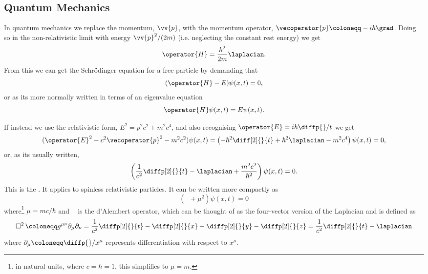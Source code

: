 \documentclass[fleqn]{NotesClass}
\newcommand*{\dAlembert}{\mathop{{}\Box^2}\nolimits}
\begin{document}
    \subsection{Quantum Mechanics}
    In quantum mechanics we replace the momentum, \(\vv{p}\), with the momentum operator, \(\vecoperator{p} \coloneqq -i\hbar\grad\).
    Doing so in the non-relativistic limit with energy \(\vv{p}^2/(2m)\) (i.e. neglecting the constant rest energy) we get
    \begin{equation}
        \operator{H} = \frac{\hbar^2}{2m}\laplacian.
    \end{equation}
    From this we can get the Schr\"odinger equation for a free particle by demanding that
    \begin{equation}
        (\operator{H} - E)\psi(x, t) = 0,
    \end{equation}
    or as its more normally written in terms of an eigenvalue equation
    \begin{equation}
        \operator{H} \psi(x, t) = E\psi(x, t).
    \end{equation}
    
    If instead we use the relativistic form, \(E^2 = p^2c^2 + m^2c^4\), and also recognising \(\operator{E} = i\hbar\diffp{}/{t}\) we get
    \begin{equation}
        (\operator{E}^2 - c^2\vecoperator{p}^2 - m^2c^2)\psi(x, t) = 
        \left( -\hbar^2\diff[2]{}{t} + \hbar^2\laplacian - m^2c^4 \right)\psi(x, t) = 0,
    \end{equation}
    or, as its usually written,
    \begin{equation}
        \left( \frac{1}{c^2}\diffp[2]{}{t} - \laplacian + \frac{m^2c^2}{\hbar^2} \right)\psi(x, t) = 0.
    \end{equation}
    This is the .
    It applies to spinless relativistic particles.
    It can be written more compactly as
    \begin{equation}
        (\dAlembert + \mu^2)\psi(x, t) = 0
    \end{equation}
    where\footnote{in natural units, where \(c = \hbar = 1\), this simplifies to \(\mu = m\).} \(\mu = mc/\hbar\) and \(\dAlembert\) is the d'Alembert operator, which can be thought of as the four-vector version of the Laplacian and is defined as
    \begin{equation}
        \dAlembert \coloneqq g^{\mu\nu}\partial_\mu\partial_\nu = \frac{1}{c^2}\diffp[2]{}{t} - \diffp[2]{}{x} - \diffp[2]{}{y} - \diffp[2]{}{z} = \frac{1}{c^2}\diffp[2]{}{t} - \laplacian
    \end{equation}
    where \(\partial_\mu \coloneqq \diffp{}/{x^\mu}\) represents differentiation with respect to \(x^\mu\).
    
\end{document}

